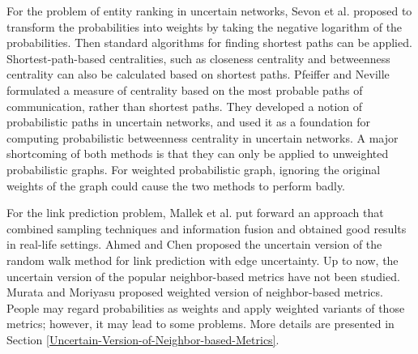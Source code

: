 \documentclass[\main/thesis.tex]{subfiles}
\begin{document}

For the problem of entity ranking in uncertain networks, Sevon et al. \cite{sevon2006link} proposed to transform the probabilities into weights by taking the negative logarithm of the probabilities. Then standard algorithms for finding shortest paths can be applied. Shortest-path-based centralities, such as closeness centrality and betweenness centrality can also be calculated based on shortest paths. Pfeiffer and Neville \cite{pfeiffer2010probabilistic} formulated a measure of centrality based on the most probable paths of communication, rather than shortest paths. They developed a notion of probabilistic paths in uncertain networks, and used it as a foundation for computing probabilistic betweenness centrality in uncertain networks. A major shortcoming of both methods is that they can only be applied to unweighted probabilistic graphs. For weighted probabilistic graph, ignoring the original weights of the graph could cause the two methods to perform badly.

For the link prediction problem, Mallek et al. \cite{mallek2016evidential} put forward an approach that combined sampling techniques and information fusion and obtained good results in real-life settings. Ahmed and Chen \cite{ahmed2016efficient} proposed the uncertain version of the random walk method for link prediction with edge uncertainty. Up to now, the uncertain version of the popular neighbor-based metrics have not been studied. Murata and Moriyasu \cite{murata2007link} proposed weighted version of neighbor-based metrics. People may regard probabilities as weights and apply weighted variants of those metrics; however, it may lead to some problems. More details are presented in Section \ref{Uncertain-Version-of-Neighbor-based-Metrics}.
\end{document}
